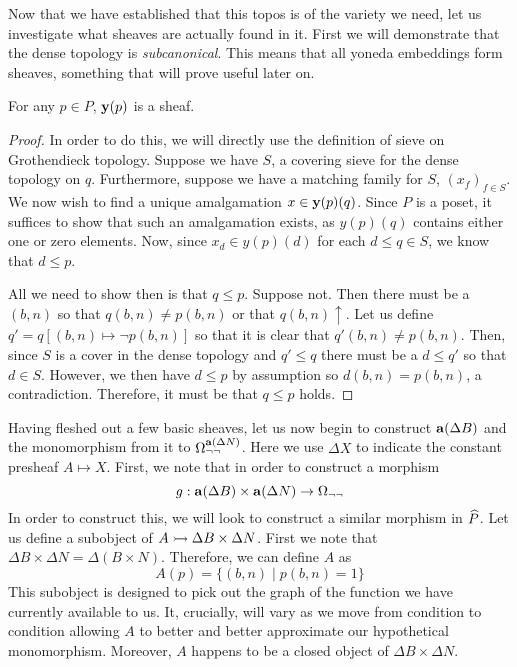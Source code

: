 Now that we have established that this topos is of the variety we
need, let us investigate what sheaves are actually found in it. First
we will demonstrate that the dense topology is
\emph{subcanonical}. This means that all yoneda embeddings form
sheaves, something that will prove useful later on.

\begin{lem}\label{lem:cohentopos:subcanonical}
  For any $p \in P$, $\mathbf{y}(p)$ is a sheaf.
\end{lem}
\begin{proof}
  In order to do this, we will directly use the definition of sieve on
  Grothendieck topology. Suppose we have $S$, a covering sieve for the
  dense topology on $q$. Furthermore, suppose we have a matching
  family for $S$, $(x_f)_{f \in S}$. We now wish to find a unique
  amalgamation $x \in \mathbf{y}(p)(q)$. Since $P$ is a poset, it
  suffices to show that such an amalgamation exists, as $y(p)(q)$
  contains either one or zero elements. Now, since $x_d \in y(p)(d)$
  for each $d \le q \in S$, we know that $d \le p$.

  All we need to show then is that $q \le p$. Suppose not. Then there
  must be a $(b, n)$ so that $q(b, n) \neq p(b, n)$ or that
  $q(b, n) \uparrow$.  Let us define
  $q' = q[(b, n) \mapsto \neg p(b, n)]$ so that it is clear that
  $q'(b, n) \neq p(b, n)$. Then, since $S$ is a cover in the dense
  topology and $q' \le q$ there must be a $d \le q'$ so that
  $d \in S$. However, we then have $d \le p$ by assumption so
  $d(b, n) = p(b, n)$, a contradiction. Therefore, it must be that
  $q \le p$ holds.
\end{proof}

Having fleshed out a few basic sheaves, let us now begin to construct
$\mathbf{a}(\Delta B)$ and the monomorphism from it to
$\Omega_{\neg\neg}^{\mathbf{a}(\Delta N)}$. Here we use $\Delta X$ to
indicate the constant presheaf $A \mapsto X$. First, we note that in
order to construct a morphism
\[
  g : \mathbf{a}(\Delta B) \times \mathbf{a}(\Delta N) \to \Omega_{\neg\neg}
\]
In order to construct this, we will look to construct a similar
morphism in $\widehat{P}$. Let us define a subobject of
$A \rightarrowtail \Delta B \times \Delta N$. First we note that
$\Delta B \times \Delta N = \Delta (B \times N)$. Therefore, we can
define $A$ as
\[
  A(p) = \{(b, n) \mid p(b, n) = 1\}
\]
This subobject is designed to pick out the graph of the function we
have currently available to us. It, crucially, will vary as we move
from condition to condition allowing $A$ to better and better
approximate our hypothetical monomorphism. Moreover, $A$ happens to be
a closed object of $\Delta B \times \Delta N$.

